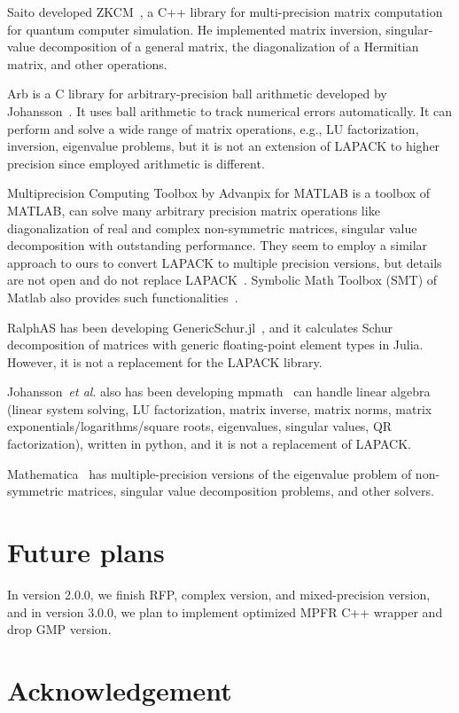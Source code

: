 \documentclass[12pt]{article}
\newcommand{\etal}{\textit{et al}.}
\begin{document}
Saito developed ZKCM~\cite{SAITOH20132005}, a C++ library for multi-precision matrix computation for quantum computer simulation. He implemented matrix inversion, singular-value decomposition of a general matrix, the diagonalization of a Hermitian matrix, and other operations.

Arb is a C library for arbitrary-precision ball arithmetic developed by Johansson~\cite{1611.02831}. It uses ball arithmetic to track
numerical errors automatically.  It can perform and solve a wide range of matrix operations, e.g.,  LU factorization, inversion, eigenvalue problems, but it is not an extension of LAPACK to higher precision since employed arithmetic is different. 

Multiprecision Computing Toolbox by Advanpix for MATLAB is a toolbox of MATLAB, can solve many arbitrary precision matrix operations
like diagonalization of real and complex non-symmetric matrices, singular value decomposition with
outstanding performance. They seem to employ a similar approach to ours to convert LAPACK to multiple precision versions, but details are not open and do not replace LAPACK~\cite{advanpix}. Symbolic Math Toolbox (SMT) of Matlab also provides such functionalities~\cite{matlabsymbolic}.

RalphAS has been developing GenericSchur.jl~\cite{GenericSchur}, and it calculates Schur decomposition of matrices with generic floating-point element types in Julia. However, it is not a replacement for the LAPACK library.

Johansson~\etal{} also has been developing mpmath~\cite{mpmath} can handle linear algebra (linear system solving, LU factorization, matrix inverse, matrix norms, matrix exponentials/logarithms/square roots, eigenvalues, singular values, QR factorization), written in python, and it is not a replacement of LAPACK.

Mathematica~\cite{mathematica} has multiple-precision versions of the eigenvalue problem of non-symmetric matrices, singular value decomposition problems, and other solvers.

\section{Future plans}
\label{sec:futureplans}
In version 2.0.0, we finish RFP, complex version, and mixed-precision version, and in version 3.0.0, we plan to implement optimized MPFR C++ wrapper and drop GMP version.

\section*{Acknowledgement}
\end{document}
